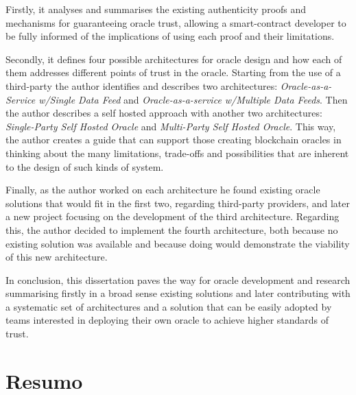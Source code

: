 Firstly, it analyses and summarises the existing authenticity proofs and mechanisms for guaranteeing oracle trust, allowing a smart-contract developer to be fully informed of the implications of using each proof and their limitations.

Secondly, it defines four possible architectures for oracle design and how each of them addresses different points of trust in the oracle. Starting from the use of a third-party the author identifies and describes two architectures: \textit{Oracle-as-a-Service w/Single Data Feed} and \textit{Oracle-as-a-service w/Multiple Data Feeds}. Then the author describes a self hosted approach with another two architectures: \textit{Single-Party Self Hosted Oracle} and \textit{Multi-Party Self Hosted Oracle}. This way, the author creates a guide that can support those creating blockchain oracles in thinking about the many limitations, trade-offs and possibilities that are inherent to the design of such kinds of system.

Finally, as the author worked on each architecture he found existing oracle solutions that would fit in the first two, regarding third-party providers, and later a new project focusing on the development of the third architecture. Regarding this, the author decided to implement the fourth architecture, both because no existing solution was available and because doing would demonstrate the viability of this new architecture.

In conclusion, this dissertation paves the way for oracle development and research summarising firstly in a broad sense existing solutions and later contributing with a systematic set of architectures and a solution that can be easily adopted by teams interested in deploying their own oracle to achieve higher standards of trust.


\chapter*{Resumo}





